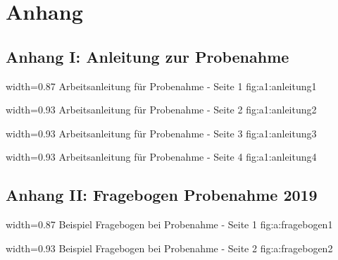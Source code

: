 \section{Anhang}
\subsection{Anhang I: Anleitung zur Probenahme}
\label{chap:anhang_Anleitung}

  {width=0.87\textwidth} %
  {Arbeitsanleitung für Probenahme - Seite 1} %
  {} %
  {fig:a1:anleitung1} %
  
  {width=0.93\textwidth} %
  {Arbeitsanleitung für Probenahme - Seite 2} %
  {} %
  {fig:a1:anleitung2} %
  
  {width=0.93\textwidth} %
  {Arbeitsanleitung für Probenahme - Seite 3} %
  {} %
  {fig:a1:anleitung3} %
  
  {width=0.93\textwidth} %
  {Arbeitsanleitung für Probenahme - Seite 4} %
  {} %
  {fig:a1:anleitung4} %

\subsection{Anhang II: Fragebogen Probenahme 2019}
\label{chap:anhang_Fragebogen}
  {width=0.87\textwidth} %
  {Beispiel Fragebogen bei Probenahme - Seite 1} %
  {} %
  {fig:a:fragebogen1} %
  
  {width=0.93\textwidth} %
  {Beispiel Fragebogen bei Probenahme - Seite 2} %
  {} %
  {fig:a:fragebogen2} %

